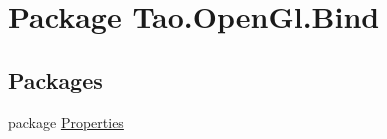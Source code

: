 \hypertarget{namespace_tao_1_1_open_gl_1_1_bind}{
\section{Package Tao.OpenGl.Bind}
\label{namespace_tao_1_1_open_gl_1_1_bind}
}
\subsection*{Packages}
\begin{DoxyCompactItemize}
\item 
package \hyperlink{namespace_tao_1_1_open_gl_1_1_bind_1_1_properties}{Properties}
\end{DoxyCompactItemize}

